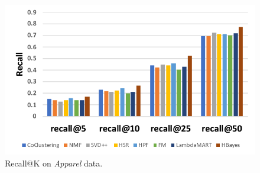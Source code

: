 \begin{figure}[!htb]
\endminipage\hfill
{}%
  \includegraphics[width=\linewidth]{fig/recall_jd}
  \caption{Recall@K on \emph{Apparel} data.}\label{fig:awesome_image3}
\endminipage
\end{figure}



